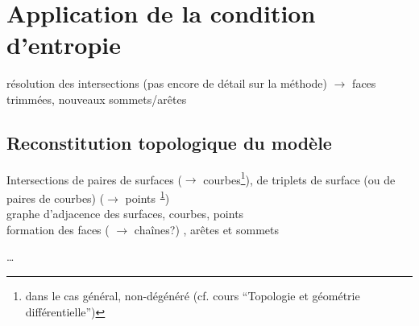 \section{Application de la condition d'entropie}
résolution des intersections (pas encore de détail sur la méthode) $\to$ faces trimmées, nouveaux sommets/arêtes

\subsection{Reconstitution topologique du modèle \brep}
Intersections de paires de surfaces ($\to$ courbes\footnote{dans le cas général, non-dégénéré (cf. cours ``Topologie et géométrie différentielle'')\label{foot}}), de triplets de surface (ou de paires de courbes) ($\to$ points\textsuperscript{~\ref{foot}})\\
graphe d'adjacence des surfaces, courbes, points \cite[Chap. 4]{pentcheva2010}\\
formation des faces ( $\to$ chaînes?) \cite[Chap. 7]{pentcheva2010}, arêtes et sommets \cite[Chap. 5]{pentcheva2010}

\ldots

